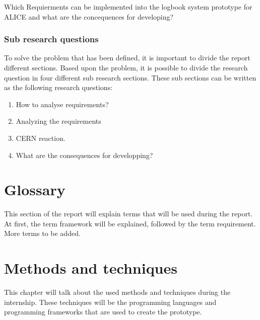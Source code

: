\documentclass[paper=a4, fontsize=11pt,twoside]{scrartcl}	%
\begin{document}
Which Requierments can be implemented into the logbook system prototype for ALICE and what are the concequences for developing?
\subsubsection{Sub research questions}
To solve the problem that has been defined, it is important to divide the report different sections. Based upon the problem, it is possible to divide the research question in four different sub research sections. These sub sections can be written as the following research questions:  
\begin{enumerate}
\item How to analyse requirements?
\item Analyzing the requirements
\item CERN reaction.
\item What are the consequences for developping?
\end{enumerate}
% 
%
%
% 
% 
% 
\newpage
\section{Glossary}
This section of the report will explain terms that will be used during the report. At first, the term framework will be explained, followed by the term requirement. More terms to be added.

 

\newpage
\section{Methods and techniques}
This chapter will talk about the used methods and techniques during the internship. These techniques will be the programming languages and programming frameworks that are used to create the prototype.
\end{document}
